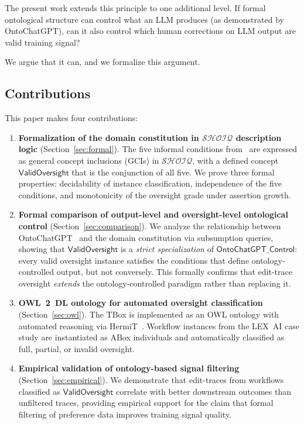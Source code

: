 \documentclass[11pt]{article}
\newcommand{\DL}{\ensuremath{\mathcal{SHOIQ}}\xspace}
\begin{document}
The present work extends this principle to one additional level.
If formal ontological structure can control what an LLM produces (as demonstrated by OntoChatGPT), can it also control which human corrections on LLM output are valid training signal?

We argue that it can, and we formalize this argument.

\subsection{Contributions}
\label{sec:contributions}

This paper makes four contributions:

\begin{enumerate}[label=(\arabic*),leftmargin=2em]

\item \textbf{Formalization of the domain constitution in \DL description logic} (Section~\ref{sec:formal}).
The five informal conditions from~\citet{ovcharov2026edittrace} are expressed as general concept inclusions (GCIs) in \DL, with a defined concept $\mathsf{ValidOversight}$ that is the conjunction of all five.
We prove three formal properties: decidability of instance classification, independence of the five conditions, and monotonicity of the oversight grade under assertion growth.

\item \textbf{Formal comparison of output-level and oversight-level ontological control} (Section~\ref{sec:comparison}).
We analyze the relationship between OntoChatGPT~\citep{palagin2023ontochatgpt} and the domain constitution via subsumption queries, showing that $\mathsf{ValidOversight}$ is a \emph{strict specialization} of $\mathsf{OntoChatGPT\_Control}$: every valid oversight instance satisfies the conditions that define ontology-controlled output, but not conversely.
This formally confirms that edit-trace oversight \emph{extends} the ontology-controlled paradigm rather than replacing it.

\item \textbf{OWL~2~DL ontology for automated oversight classification} (Section~\ref{sec:owl}).
The TBox is implemented as an OWL ontology with automated reasoning via HermiT~\citep{shearer2008hermit}.
Workflow instances from the LEX~AI case study are instantiated as ABox individuals and automatically classified as full, partial, or invalid oversight.

\item \textbf{Empirical validation of ontology-based signal filtering} (Section~\ref{sec:empirical}).
We demonstrate that edit-traces from workflows classified as $\mathsf{ValidOversight}$ correlate with better downstream outcomes than unfiltered traces, providing empirical support for the claim that formal filtering of preference data improves training signal quality.

\end{enumerate}
\end{document}

